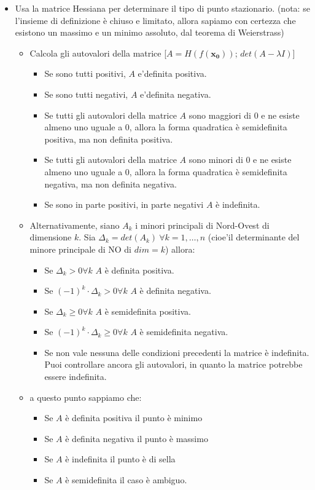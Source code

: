 \documentclass[a4paper,12pt]{book}
\begin{document}
\begin{itemize}
\item Usa la matrice Hessiana per determinare il tipo di punto stazionario. (nota: se l'insieme di definizione è chiuso e limitato, allora sapiamo con certezza che esistono un massimo e un minimo assoluto, dal teorema di Weierstrass)
\begin{itemize}
 \item Calcola gli autovalori della matrice [$A = H(f(\boldsymbol{x_0}))$; $det(A-\lambda I)$]
 \begin{itemize}
  \item Se sono tutti positivi, $A$ e'definita positiva.
  \item Se sono tutti negativi, $A$ e'definita negativa.
  \item Se tutti gli autovalori della matrice $A$ sono maggiori di $0$ e ne esiste almeno uno uguale a $0$, allora la forma quadratica è semidefinita positiva, ma non definita positiva.
  \item Se tutti gli autovalori della matrice $A$ sono minori di $0$ e ne esiste almeno uno uguale a $0$, allora la forma quadratica è semidefinita negativa, ma non definita negativa.
  \item Se sono in parte positivi, in parte negativi $A$ è indefinita.
 \end{itemize}
 \item Alternativamente, siano $A_k$ i minori principali di Nord-Ovest di dimensione $k$.
Sia $\Delta_k=det(A_k)\ \forall k=1,\dots,n$ (cioe'il determinante del minore principale di NO di $dim=k$) allora:
 \begin{itemize}
  \item Se $\Delta_k > 0 \forall k$ $A$ è definita positiva.
  \item Se $(-1)^k\cdot\Delta_k > 0 \forall k$ $A$  è definita negativa.
  \item Se $\Delta_k \geq 0 \forall k$ $A$ è semidefinita positiva. 
  \item Se $(-1)^k\cdot\Delta_k \geq 0 \forall k$ $A$  è semidefinita negativa. 
  \item Se non vale nessuna delle condizioni precedenti la matrice è indefinita. Puoi controllare ancora gli autovalori, in quanto la matrice potrebbe essere indefinita. 
 \end{itemize}
 \item a questo punto sappiamo che:
 \begin{itemize}

 \item Se $A$ è definita positiva il punto è minimo
 \item Se $A$ è definita negativa il punto è massimo
 \item Se $A$ è indefinita il punto è di sella
 \item Se $A$ è semidefinita il caso è ambiguo.
 \end{itemize}
 

\end{itemize}
\end{itemize}
\end{document}
